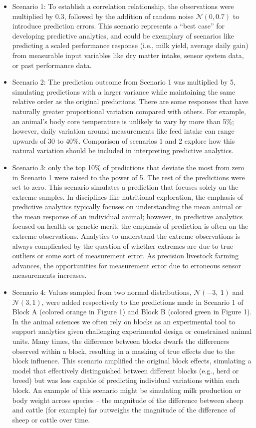 \begin{itemize}
    \item Scenario 1: To establish a correlation relationship, the observations were multiplied by 0.3, followed by the addition of random noise $\mathcal{N}(0, 0.7)$ to introduce prediction errors. This scenario represents a “best case” for developing predictive analytics, and could be exemplary of scenarios like predicting a scaled performance response (i.e., milk yield, average daily gain) from measurable input variables like dry matter intake, sensor system data, or past performance data.
	\item Scenario 2: The prediction outcome from Scenario 1 was multiplied by 5, simulating predictions with a larger variance while maintaining the same relative order as the original predictions. There are some responses that have naturally greater proportional variation compared with others. For example, an animal’s body core temperature is unlikely to vary by more than 5\%; however, daily variation around measurements like feed intake can range upwards of 30 to 40\%. Comparison of scenarios 1 and 2 explore how this natural variation should be included in interpreting predictive analytics.
	\item Scenario 3: only the top 10\% of predictions that deviate the most from zero in Scenario 1 were raised to the power of 5. The rest of the predictions were set to zero. This scenario simulates a prediction that focuses solely on the extreme samples. In disciplines like nutritional exploration, the emphasis of predictive analytics typically focuses on understanding the mean animal or the mean response of an individual animal; however, in predictive analytics focused on health or genetic merit, the emphasis of prediction is often on the extreme observations. Analytics to understand the extreme observations is always complicated by the question of whether extremes are due to true outliers or some sort of measurement error. As precision livestock farming advances, the opportunities for measurement error due to erroneous sensor measurements increases.
	\item Scenario 4: Values sampled from two normal distributions, $\mathcal{N}(-3,\ 1)$ and $\mathcal{N}(3, 1)$, were added respectively to the predictions made in Scenario 1 of Block A (colored orange in Figure 1) and Block B (colored green in Figure 1). In the animal sciences we often rely on blocks as an experimental tool to support analytics given challenging experimental design or constrained animal units. Many times, the difference between blocks dwarfs the differences observed within a block, resulting in a masking of true effects due to the block influence. This scenario amplified the original block effects, simulating a model that effectively distinguished between different blocks (e.g., herd or breed) but was less capable of predicting individual variations within each block. An example of this scenario might be simulating milk production or body weight across species – the magnitude of the difference between sheep and cattle (for example) far outweighs the magnitude of the difference of sheep or cattle over time.
\end{itemize}
